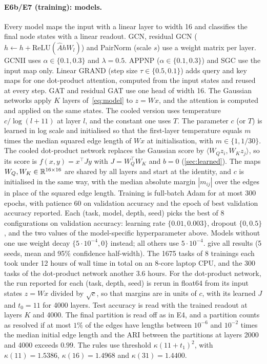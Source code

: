 \paragraph{E6b/E7 (training): models.} Every model maps the input with a linear layer to width 16 and classifies the final node states with a
linear readout. GCN, residual GCN ($h\leftarrow h+\mathrm{ReLU}(\hat Ah W_l)$) and PairNorm (scale $s$) use a weight matrix per layer. GCNII
uses $\alpha\in\{0.1,0.3\}$ and $\lambda=0.5$. APPNP ($\alpha\in\{0.1,0.3\}$) and SGC use the input map only. Linear GRAND (step size
$\tau\in\{0.5,0.1\}$) adds query and key maps for one dot-product attention, computed from the input states and reused at every step. GAT and
residual GAT use one head of width 16. The Gaussian networks
apply $K$ layers of~\eqref{eq:model} to $z=Wx$, and the attention is computed and applied on the same states. The cooled version uses
temperature $c/\log(l+11)$ at layer $l$, and the constant one uses $T$. The parameter $c$ (or $T$) is learned in log scale and initialised
so that the first-layer temperature equals $m$ times the median squared edge length of $Wx$ at initialisation, with $m\in\{1,1/30\}$.
The cooled dot-product network replaces the Gaussian score by $\langle W_Qz_i,W_Kz_j\rangle$, so its score is $f(x,y)=x^\top Jy$ with
$J=W_Q^\top W_K$ and $b=0$ (\cref{sec:learned}). The maps $W_Q,W_K\in\mathbb{R}^{16\times16}$ are shared by all layers and start at the identity, and $c$
is initialised in the same way, with the median absolute margin $|m_{ij}|$ over the edges in place of the squared edge length.
Training is full-batch Adam for at most 300 epochs, with patience 60 on validation accuracy and the epoch of best validation accuracy
reported. Each (task, model, depth, seed) picks the best of 8 configurations on validation accuracy: learning rate $\{0.01,0.003\}$, dropout
$\{0,0.5\}$, and the two values of the model-specific hyperparameter above. Models without one use weight decay
$\{5\cdot10^{-4},0\}$ instead; all others use $5\cdot10^{-4}$.  give all results (5 seeds, mean and
95\% confidence half-width). The 1675 tasks of 8 trainings each took under 12 hours of wall time in total on an 8-core laptop CPU, and the
300 tasks of the dot-product network another 3.6 hours. For the dot-product network, the run reported for each (task, depth, seed) is rerun
in float64 from its input states $z=Wx$ divided by $\sqrt c$, so that margins are in units of $c$, with its learned $J$ and $t_0=11$
for 4000 layers. Test accuracy is read with the trained readout at layers $K$ and 4000. The final partition is read off as in E4, and a
partition counts as resolved if at most $1\%$ of the edges have lengths between $10^{-6}$ and $10^{-2}$ times the median initial edge length
and the ARI between the partitions at layers 2000 and 4000 exceeds $0.99$. The rules use threshold $\kappa(11+t_1)^2$, with
$\kappa(11)=1.5386$, $\kappa(16)=1.4968$ and $\kappa(31)=1.4400$.

